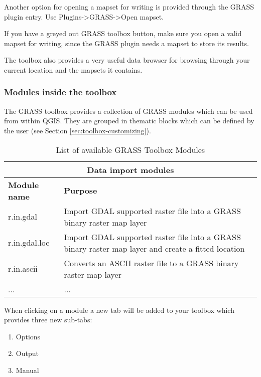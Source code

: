Another option for opening a mapset for writing is provided through the 
GRASS plugin entry. Use Plugins->GRASS->Open mapset.
 
If you have a greyed out GRASS toolbox button, make sure you open a valid
mapset for writing, since the GRASS plugin needs a mapset to store its
results.

The toolbox also provides a very useful data browser for browsing through your
current location and the mapsets it contains.


\subsubsection{Modules inside the toolbox} 

The GRASS toolbox provides a collection of GRASS modules which can be used
from within QGIS. They are grouped in thematic blocks which can be defined 
by the user (see Section \ref{sec:toolbox-customizing}). 


\begin{table}[h]
\centering
\caption{List of available GRASS Toolbox Modules}\label{tab:grass_modules}\medskip
 \begin{tabular}{|l|p{5.3in}|}
  \hline \multicolumn{2}{|c|}{\textbf{Data import modules}} \\ 
  \hline \textbf{Module name} & \textbf{Purpose} \\
  \hline r.in.gdal &  Import GDAL supported raster file into a GRASS binary raster map layer \\
  \hline r.in.gdal.loc &  Import GDAL supported raster file into a GRASS
  binary raster map layer and create a fitted location \\
  \hline r.in.ascii & Converts an ASCII raster file to a GRASS binary raster map layer \\
  \hline ... & ... \\
\hline
\end{tabular}
\end{table}


When clicking on a module a new tab will be added to your toolbox which
provides three new sub-tabs:
\begin{enumerate}
\item Options
\item Output 
\item Manual
\end{enumerate}

